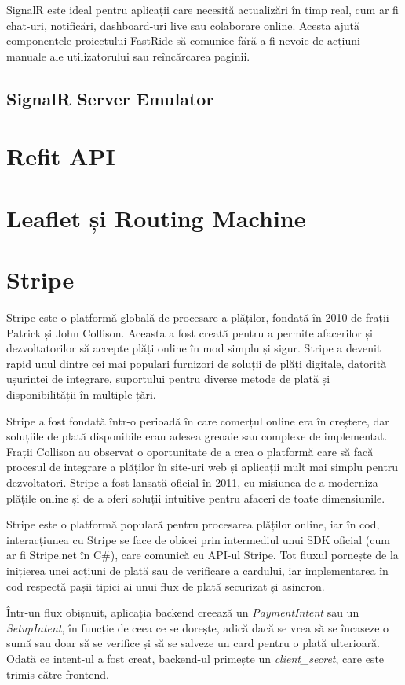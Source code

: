 SignalR este ideal pentru aplicații care necesită actualizări în timp real, cum ar fi chat-uri, notificări, dashboard-uri live sau colaborare online.
Acesta ajută componentele proiectului FastRide să comunice fără a fi nevoie de acțiuni manuale ale utilizatorului sau reîncărcarea paginii.

\subsection{SignalR Server Emulator}
\section{Refit API}
\section{Leaflet și Routing Machine}
\section{Stripe}
Stripe este o platformă globală de procesare a plăților, fondată în 2010 de frații Patrick și
John Collison. Aceasta a fost creată pentru a permite afacerilor și dezvoltatorilor să accepte plăți
online în mod simplu și sigur. Stripe a devenit rapid unul dintre cei mai populari furnizori de
soluții de plăți digitale, datorită ușurinței de integrare, suportului pentru diverse metode de plată
și disponibilității în multiple țări. \parencite{stripe}

Stripe a fost fondată într-o perioadă în care comerțul online era în creștere, dar soluțiile de
plată disponibile erau adesea greoaie sau complexe de implementat. Frații Collison au observat o
oportunitate de a crea o platformă care să facă procesul de integrare a plăților în site-uri web și
aplicații mult mai simplu pentru dezvoltatori. Stripe a fost lansată oficial în 2011, cu misiunea de
a moderniza plățile online și de a oferi soluții intuitive pentru afaceri de toate dimensiunile. \parencite{stripe}

Stripe este o platformă populară pentru procesarea plăților online, iar în cod, interacțiunea cu Stripe se face de obicei prin intermediul unui SDK oficial (cum ar fi Stripe.net în C\#), care comunică cu API-ul Stripe. Tot fluxul pornește de la inițierea unei acțiuni de plată sau de verificare a cardului, iar implementarea în cod respectă pașii tipici ai unui flux de plată securizat și asincron. \parencite{stripe}

Într-un flux obișnuit, aplicația backend creează un \textit{PaymentIntent} sau un \textit{SetupIntent}, în funcție de ceea ce se dorește, adică dacă se vrea să se încaseze o sumă sau doar să se verifice și să se salveze un card pentru o plată ulterioară. Odată ce intent-ul a fost creat, backend-ul primește un \textit{client\_secret}, care este trimis către frontend. \parencite{stripe}

